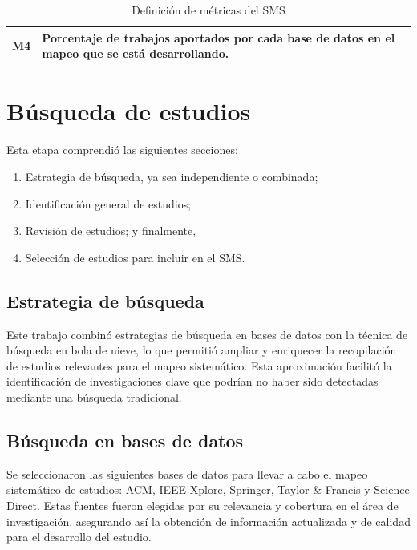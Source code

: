 \begin{table}[H]
\begin{tabular}{|c|p{13cm}|}
		M4               & Porcentaje de trabajos aportados por cada base de datos en el mapeo que se está desarrollando.                                                                                                                                                                                                                                                                                                                                                                                                                 \\ \hline
	\end{tabular}
	\caption{Definición de métricas del SMS}
	\label{tab:metricas}
\end{table}


\newpage \section{Búsqueda de estudios}


Esta etapa comprendió las siguientes secciones:
\begin{enumerate}
	\item Estrategia de búsqueda, ya sea independiente o combinada;
	\item Identificación general de estudios;
	\item Revisión de estudios; y finalmente,
	\item Selección de estudios para incluir en el SMS.\@
\end{enumerate}

\subsection{Estrategia de búsqueda}

Este trabajo combinó estrategias de búsqueda en bases de datos con la técnica de búsqueda en bola de nieve, lo que permitió ampliar y enriquecer la recopilación de estudios relevantes para el mapeo sistemático. Esta aproximación facilitó la identificación de investigaciones clave que podrían no haber sido detectadas mediante una búsqueda tradicional.

\subsection{Búsqueda en bases de datos}\label{subsec:busquedaBasesDatos}
Se seleccionaron las siguientes bases de datos para llevar a cabo el mapeo sistemático de estudios: ACM, IEEE Xplore, Springer, Taylor \& Francis y Science Direct. Estas fuentes fueron elegidas por su relevancia y cobertura en el área de investigación, asegurando así la obtención de información actualizada y de calidad para el desarrollo del estudio.


